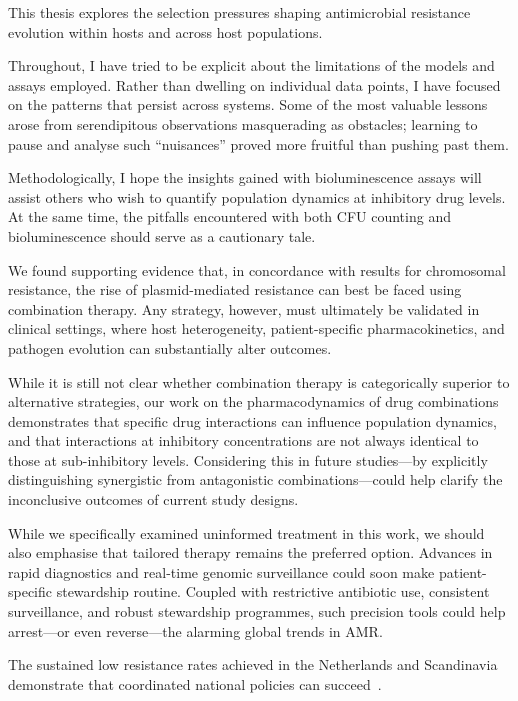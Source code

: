 \documentclass[../main.tex]{subfiles}
\begin{document}
This thesis explores the selection pressures shaping antimicrobial resistance evolution within hosts and across host populations.

Throughout, I have tried to be explicit about the limitations of the models and assays employed. Rather than dwelling on individual data points, I have focused on the patterns that persist across systems. Some of the most valuable lessons arose from serendipitous observations masquerading as obstacles; learning to pause and analyse such “nuisances” proved more fruitful than pushing past them.

Methodologically, I hope the insights gained with bioluminescence assays will assist others who wish to quantify population dynamics at inhibitory drug levels. At the same time, the pitfalls encountered with both CFU counting and bioluminescence should serve as a cautionary tale.

We found supporting evidence that, in concordance with results for chromosomal resistance, the rise of plasmid-mediated resistance can best be faced using combination therapy. Any strategy, however, must ultimately be validated in clinical settings, where host heterogeneity, patient-specific pharmacokinetics, and pathogen evolution can substantially alter outcomes.

While it is still not clear whether combination therapy is categorically superior to alternative strategies, our work on the pharmacodynamics of drug combinations demonstrates that specific drug interactions can influence population dynamics, and that interactions at inhibitory concentrations are not always identical to those at sub-inhibitory levels. Considering this in future studies—by explicitly distinguishing synergistic from antagonistic combinations—could help clarify the inconclusive outcomes of current study designs.

While we specifically examined uninformed treatment in this work, we should also emphasise that tailored therapy remains the preferred option. Advances in rapid diagnostics and real-time genomic surveillance could soon make patient-specific stewardship routine. Coupled with restrictive antibiotic use, consistent surveillance, and robust stewardship programmes, such precision tools could help arrest—or even reverse—the alarming global trends in AMR.

The sustained low resistance rates achieved in the Netherlands and Scandinavia demonstrate that coordinated national policies can succeed~\cite{ECDC2023_NL_SE}.
\end{document}
